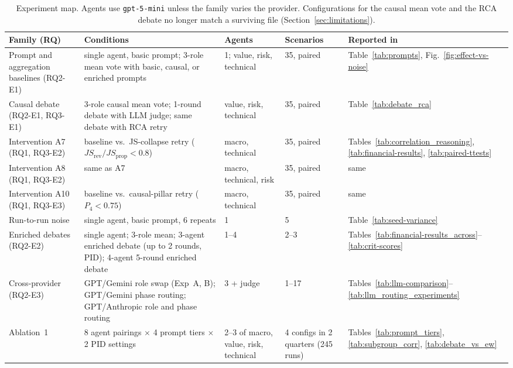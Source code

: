 \documentclass{article}
\begin{document}
\begin{table}[H]
\centering
\footnotesize
\begin{tabular}{@{}p{2.2cm}p{3.9cm}p{2.4cm}p{1.5cm}p{2.0cm}@{}}
\toprule
\textbf{Family (RQ)} & \textbf{Conditions} & \textbf{Agents} & \textbf{Scenarios} & \textbf{Reported in} \\
\midrule
Prompt and aggregation baselines (RQ2-E1) & single agent, basic prompt; 3-role mean vote with basic, causal, or enriched prompts & 1; value, risk, technical & 35, paired & Table~\ref{tab:prompts}, Fig.~\ref{fig:effect-vs-noise} \\
Causal debate (RQ2-E1, RQ3-E1) & 3-role causal mean vote; 1-round debate with LLM judge; same debate with RCA retry & value, risk, technical & 35, paired & Table~\ref{tab:debate_rca} \\
Intervention A7 (RQ1, RQ3-E2) & baseline vs.\ JS-collapse retry ($JS_{\text{rev}}/JS_{\text{prop}}<0.8$) & macro, technical & 35, paired & Tables~\ref{tab:correlation_reasoning}, \ref{tab:financial-results}, \ref{tab:paired-ttests} \\
Intervention A8 (RQ1, RQ3-E2) & same as A7 & macro, technical, risk & 35, paired & same \\
Intervention A10 (RQ1, RQ3-E3) & baseline vs.\ causal-pillar retry ($P_4<0.75$) & macro, technical & 35, paired & same \\
Run-to-run noise & single agent, basic prompt, 6 repeats & 1 & 5 & Table~\ref{tab:seed-variance} \\
Enriched debates (RQ2-E2) & single agent; 3-role mean; 3-agent enriched debate (up to 2 rounds, PID); 4-agent 5-round enriched debate & 1--4 & 2--3 & Tables~\ref{tab:financial-results_across}--\ref{tab:crit-scores} \\
Cross-provider (RQ2-E3) & GPT/Gemini role swap (Exp~A, B); GPT/Gemini phase routing; GPT/Anthropic role and phase routing & 3 + judge & 1--17 & Tables~\ref{tab:llm-comparison}--\ref{tab:llm_routing_experiments} \\
Ablation~1 & 8 agent pairings $\times$ 4 prompt tiers $\times$ 2 PID settings & 2--3 of macro, value, risk, technical & 4 configs in 2 quarters (245 runs) & Tables~\ref{tab:prompt_tiers}, \ref{tab:subgroup_corr}, \ref{tab:debate_vs_ew} \\
\bottomrule
\end{tabular}
\vspace{4pt}
\caption{Experiment map. Agents use \texttt{gpt-5-mini} unless the family varies the provider. Configurations for the causal mean vote and the RCA debate no longer match a surviving file (Section~\ref{sec:limitations}).}
\label{tab:experiment-map}
\end{table}
\end{document}
